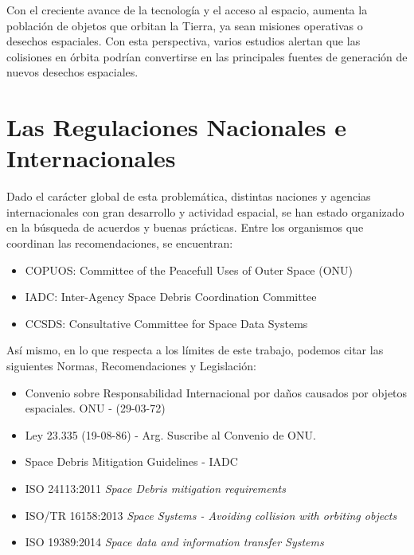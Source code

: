 Con el creciente avance de la tecnolog\'ia y el acceso al espacio, aumenta la poblaci\'on de objetos que orbitan la Tierra, ya sean  misiones operativas o desechos espaciales. Con esta perspectiva, varios estudios alertan que las colisiones en \'orbita podr\'ian convertirse en las principales fuentes de generaci\'on de nuevos desechos espaciales. \cite{KlinkradChapter8}\\

\section{Las Regulaciones Nacionales e Internacionales}

Dado el car\'acter global de esta problem\'atica, distintas naciones y agencias internacionales con gran desarrollo y actividad espacial, se han estado organizado en la b\'usqueda de acuerdos y buenas pr\'acticas. Entre los organismos que coordinan las recomendaciones, se encuentran:\\

\begin{itemize}
\item {\small{COPUOS: Committee of the Peacefull Uses of Outer Space (ONU)}}
\item {\small{IADC: Inter-Agency Space Debris Coordination Committee}}
\item {\small{CCSDS: Consultative Committee for Space Data Systems}}
\end{itemize}

As\'i mismo, en lo que respecta a los l\'imites de este trabajo, podemos citar las siguientes Normas, Recomendaciones y Legislaci\'on:\\

\begin{itemize}
\item {\small{Convenio sobre Responsabilidad Internacional por da\~nos causados por objetos espaciales. ONU - (29-03-72)}}
\item {\small{Ley 23.335 (19-08-86) - Arg. Suscribe al Convenio de ONU.}}
\item {\small{Space Debris Mitigation Guidelines - IADC}}
\item {\small{ISO 24113:2011 {\it{Space Debris mitigation requirements}}}}
\item {\small{ISO/TR 16158:2013 {\it{Space Systems - Avoiding collision with orbiting objects}}}}
\item {\small{ISO 19389:2014 {\it{Space data and information transfer Systems}}}}

\end{itemize}

